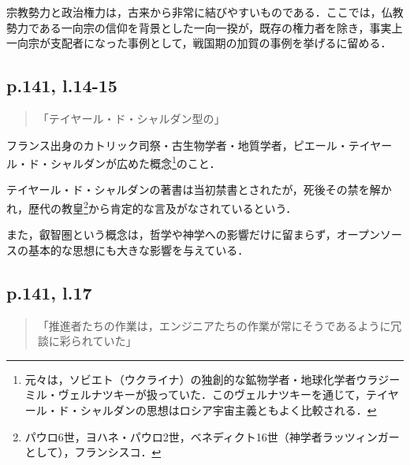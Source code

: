 \documentclass[10pt, a5paper, twoside]{jsarticle}
\theoremstyle{definition}
\begin{document}
			宗教勢力と政治権力は，古来から非常に結びやすいものである．ここでは，仏教勢力である一向宗の信仰を背景とした一向一揆が，既存の権力者を除き，事実上一向宗が支配者になった事例として，戦国期の加賀の事例を挙げるに留める．


				


		\subsection{p.141, l.14-15}

			\begin{quote}
				
				「テイヤール・ド・シャルダン型の」

			\end{quote}

			フランス出身のカトリック司祭・古生物学者・地質学者，ピエール・テイヤール・ド・シャルダンが広めた概念\footnote{元々は，ソビエト（ウクライナ）の独創的な鉱物学者・地球化学者ウラジーミル・ヴェルナツキーが扱っていた．このヴェルナツキーを通じて，テイヤール・ド・シャルダンの思想はロシア宇宙主義ともよく比較される\cite{tds}．}のこと．

			テイヤール・ド・シャルダンの著書は当初禁書とされたが，死後その禁を解かれ，歴代の教皇\footnote{パウロ6世，ヨハネ・パウロ2世，ベネディクト16世（神学者ラッツィンガーとして），フランシスコ．}から肯定的な言及がなされているという\cite{tds}．

			また，叡智圏という概念は，哲学や神学への影響だけに留まらず，オープンソースの基本的な思想にも大きな影響を与えている\cite{noo}．

		\subsection{p.141, l.17}

			\begin{quote}
				
				「推進者たちの作業は，エンジニアたちの作業が常にそうであるように冗談に彩られていた」

			\end{quote}
\end{document}
